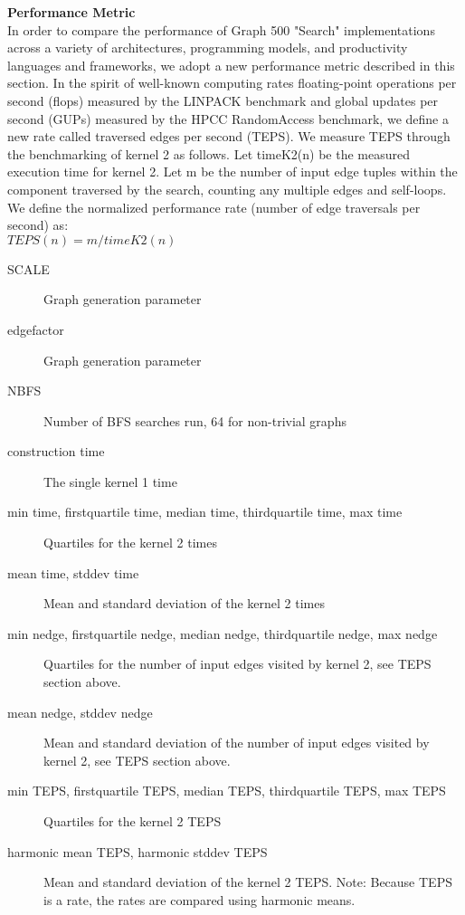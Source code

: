 \textbf{Performance Metric} \\
In order to compare the performance of Graph 500 "Search" implementations across a variety of architectures, programming models, and productivity languages and frameworks, we adopt a new performance metric described in this section. In the spirit of well-known computing rates floating-point operations per second (flops) measured by the LINPACK benchmark and global updates per second (GUPs) measured by the HPCC RandomAccess benchmark, we define a new rate called traversed edges per second (TEPS). We measure TEPS through the benchmarking of kernel 2 as follows. Let timeK2(n) be the measured execution time for kernel 2. Let m be the number of input edge tuples within the component traversed by the search, counting any multiple edges and self-loops. We define the normalized performance rate (number of edge traversals per second) as:
\\
$TEPS(n) = m / timeK2(n)$
\begin{description}
\item[SCALE] Graph generation parameter
\item[edgefactor] Graph generation parameter
\item[NBFS] Number of BFS searches run, 64 for non-trivial graphs
\item[construction time] The single kernel 1 time
\item[min time, firstquartile time, median time, thirdquartile time, max time] Quartiles for the kernel 2 times
\item[mean time, stddev time] Mean and standard deviation of the kernel 2 times
\item[min nedge, firstquartile nedge, median nedge, thirdquartile nedge, max nedge] Quartiles for the number of input edges visited by kernel 2, see TEPS section above.
\item[mean nedge, stddev nedge] Mean and standard deviation of the number of input edges visited by kernel 2, see TEPS section above.
\item[min TEPS, firstquartile TEPS, median TEPS, thirdquartile TEPS, max TEPS]  Quartiles for the kernel 2 TEPS
\item[harmonic mean TEPS, harmonic stddev TEPS] Mean and standard deviation of the kernel 2 TEPS. Note: Because TEPS is a rate, the rates are compared using harmonic means.

\end{description}

    

    

    

    

    

    

    

    

   

     
